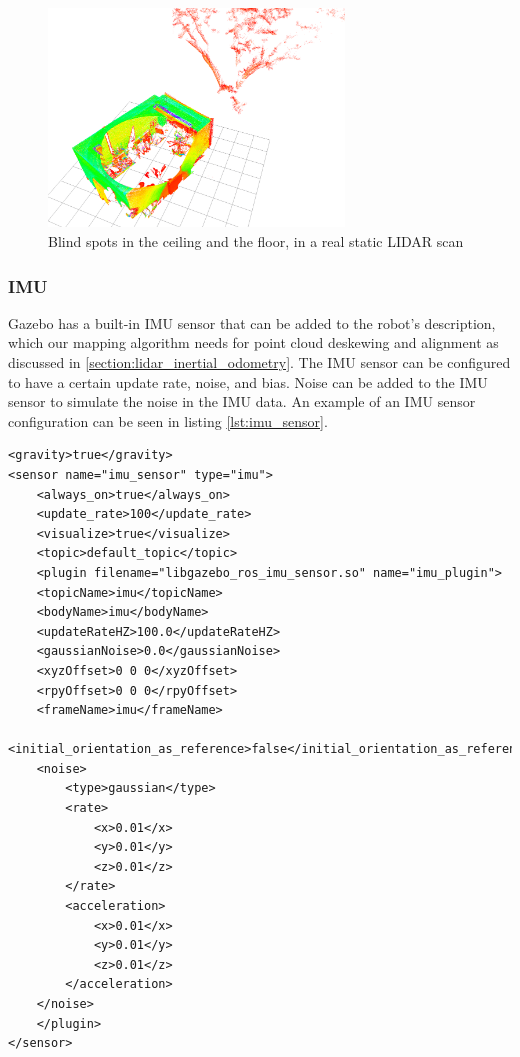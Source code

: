 \documentclass[11pt]{article}
\begin{document}
        \begin{figure}[H]
            \centering
            \includegraphics[width=0.7\textwidth]{Images/ldiar_scan_deadzone.png}
            \caption{Blind spots in the ceiling and the floor, in a real static LIDAR scan}
            \label{fig:real_lidar_scan}
        \end{figure}

        \subsubsection{IMU}

        Gazebo has a built-in IMU sensor that can be added to the robot's description, which our mapping algorithm needs for point cloud deskewing and alignment as discussed in \ref{section:lidar_inertial_odometry}. The IMU sensor can be configured to have a certain update rate, noise, and bias. Noise can be added to the IMU sensor to simulate the noise in the IMU data. An example of an IMU sensor configuration can be seen in listing \ref{lst:imu_sensor}.

    \vspace{10pt }
\begin{minipage}{0.9\textwidth}
\begin{lstlisting}[style=xmlStyle, caption={IMU Sensor Configuration}, label={lst:imu_sensor}]
<gravity>true</gravity>
<sensor name="imu_sensor" type="imu">
    <always_on>true</always_on>
    <update_rate>100</update_rate>
    <visualize>true</visualize>
    <topic>default_topic</topic>
    <plugin filename="libgazebo_ros_imu_sensor.so" name="imu_plugin">
    <topicName>imu</topicName>
    <bodyName>imu</bodyName>
    <updateRateHZ>100.0</updateRateHZ>
    <gaussianNoise>0.0</gaussianNoise>
    <xyzOffset>0 0 0</xyzOffset>
    <rpyOffset>0 0 0</rpyOffset>
    <frameName>imu</frameName>
    <initial_orientation_as_reference>false</initial_orientation_as_reference>
    <noise>
        <type>gaussian</type>
        <rate>
            <x>0.01</x>
            <y>0.01</y>
            <z>0.01</z>
        </rate>
        <acceleration>
            <x>0.01</x>
            <y>0.01</y>
            <z>0.01</z>
        </acceleration>
    </noise>
    </plugin>
</sensor>
\end{lstlisting}
\end{minipage}
\end{document}
